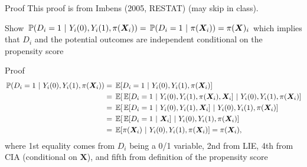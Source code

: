 \documentclass[aspectratio=169,t,11pt,table]{beamer}
\begin{document}
\begin{frame}{Proof}
  This proof is from Imbens (2005, RESTAT) (may skip in class). 
  
  Show $\prob{D_i = 1}{Y_i(0), Y_i(1), \pi(\bm{X}_i)} = \prob{D_i = 1}{\pi(\bm{X}_i)} = \pi(\bm{X})_i$ which implies that $D_i$ and the potential outcomes are independent conditional on the propensity score
\end{frame}

\begin{frame}{Proof}
  \vspace*{-2\bigskipamount}
  \begin{align*}
    \prob{D_i = 1}{Y_i(0), Y_i(1), \pi(\bm{X}_i)} 
    &= \expec{D_i = 1}{Y_i(0), Y_i(1), \pi(\bm{X}_i)} \\ 
    &= \expec{\expec{D_i = 1}{Y_i(0), Y_i(1), \pi(\bm{X}_i), \bm{X}_i}}{Y_i(0), Y_i(1), \pi(\bm{X}_i)} \\
    &= \expec{\expec{D_i = 1}{Y_i(0), Y_i(1), \bm{X}_i}}{Y_i(0), Y_i(1), \pi(\bm{X}_i)} \\
    &= \expec{\expec{D_i = 1}{\bm{X}_i}}{Y_i(0), Y_i(1), \pi(\bm{X}_i)} \\
    &= \expec{\pi(\bm{X}_i)}{Y_i(0), Y_i(1), \pi(\bm{X}_i)} = \pi(\bm{X}_i),
  \end{align*}
  where 1st equality comes from $D_i$ being a 0/1 variable, 2nd from LIE, 4th from CIA (conditional on $\bm{X}$), and fifth from definition of the propensity score
\end{frame}
\end{document}
